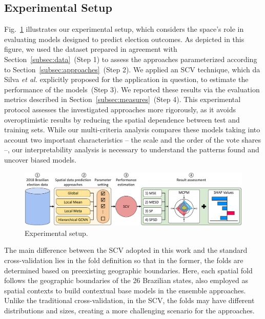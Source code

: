 \documentclass[runningheads]{llncs}
\begin{document}

\subsection{Experimental Setup}
\label{subsec:experimental_setup}

Fig.~\ref{fig:experimental_setup} illustrates our experimental setup, which considers the space's role in evaluating models designed to predict election outcomes. As depicted in this figure, we used the dataset prepared in agreement with Section~\ref{subsec:data}~(Step 1) to assess the approaches parameterized according to Section~\ref{subsec:approaches}~(Step 2). We applied an SCV technique, which da Silva \textit{et al.} \cite{tiago2021graph} explicitly proposed for the application in question, to estimate the performance of the models~(Step 3). We reported these results via the evaluation metrics described in Section~\ref{subsec:measures}~(Step 4). This experimental protocol assesses the investigated approaches more rigorously, as it avoids overoptimistic results by reducing the spatial dependence between test and training sets. While our multi-criteria analysis compares these models taking into account two important characteristics -- the scale and the order of the vote shares --, our interpretability analysis is necessary to understand the patterns found and uncover biased models. %
\begin{figure}[!ht]
    \centering
    \includegraphics[width=0.98\linewidth]{experimental_setup.pdf}
    \caption{Experimental setup.}
    \label{fig:experimental_setup}
\end{figure}

The main difference between the SCV adopted in this work and the standard cross-validation lies in the fold definition so that in the former, the folds are determined based on preexisting geographic boundaries. Here, each spatial fold follows the geographic boundaries of the 26 Brazilian states, also employed as spatial contexts to build contextual base models in the ensemble approaches. Unlike the traditional cross-validation, in the SCV, the folds may have different distributions and sizes, creating a more challenging scenario for the approaches.
\end{document}
